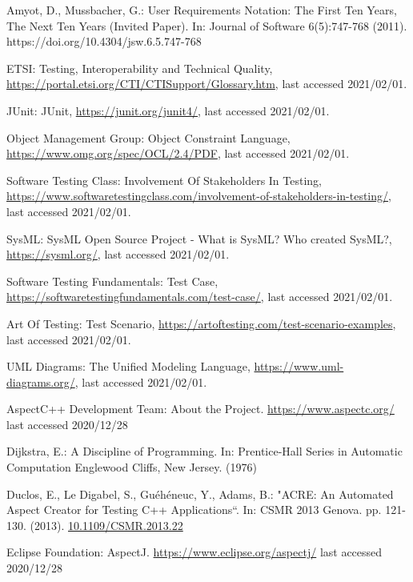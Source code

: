 \documentclass[a4paper,10pt, bibliography=totocnumbered]{scrreprt}
\begin{document}
\begin{thebibliography}{9}
 Amyot, D., Mussbacher, G.: User Requirements Notation: The First Ten Years, The Next Ten Years (Invited Paper). 
In: Journal of Software 6(5):747-768 (2011). 
https://doi.org/10.4304/jsw.6.5.747-768

 ETSI: Testing, Interoperability and Technical Quality, \url{https://portal.etsi.org/CTI/CTISupport/Glossary.htm}, last accessed 2021/02/01.

 JUnit: JUnit, \url{https://junit.org/junit4/}, last accessed 2021/02/01.

 Object Management Group: Object Constraint Language, \url{https://www.omg.org/spec/OCL/2.4/PDF}, last accessed 2021/02/01.

 Software Testing Class: Involvement Of Stakeholders In Testing, \url{https://www.softwaretestingclass.com/involvement-of-stakeholders-in-testing/}, last accessed 2021/02/01.

 SysML: SysML Open Source Project - What is SysML? Who created SysML?, \url{https://sysml.org/}, last accessed 2021/02/01.

 Software Testing Fundamentals: Test Case, \url{https://softwaretestingfundamentals.com/test-case/}, last accessed 2021/02/01.

 Art Of Testing: Test Scenario, \url{https://artoftesting.com/test-scenario-examples}, last accessed 2021/02/01.

 UML Diagrams: The Unified Modeling Language, \url{https://www.uml-diagrams.org/}, last accessed 2021/02/01.




 AspectC++ Development Team: About the Project.
\url{https://www.aspectc.org/} last accessed 2020/12/28

 Dijkstra, E.: A Discipline of Programming.
In: Prentice-Hall Series in Automatic Computation Englewood Cliffs, New Jersey. (1976)

 Duclos, E., Le Digabel, S., Guéhéneuc, Y.,  Adams, B.: "ACRE: An Automated Aspect Creator for Testing C++ Applications“.
In:  CSMR 2013 Genova.  pp. 121-130. (2013). \url{10.1109/CSMR.2013.22}

 Eclipse Foundation: AspectJ.
\url{https://www.eclipse.org/aspectj/}  last accessed 2020/12/28


\end{thebibliography}
\end{document}
